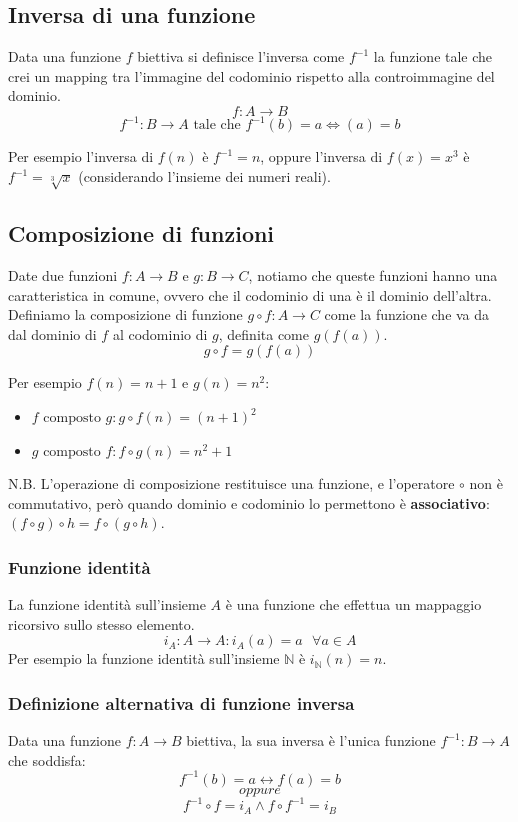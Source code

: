 \documentclass{article}
\begin{document}
\subsection{Inversa di una funzione}
Data una funzione $f$ biettiva si definisce l'inversa come $f^{-1}$ la funzione tale che crei un mapping tra l'immagine del codominio rispetto alla controimmagine del dominio.
$$f:A\rightarrow B$$
$$f^{-1}:B\rightarrow A \text{ tale che } f^{-1}(b)=a \Longleftrightarrow (a)=b$$

Per esempio l'inversa di $f(n)$ è $f^{-1}=n$, oppure l'inversa di $f(x)=x^3$ è $f^{-1}=\sqrt[3]{x}$ (considerando l'insieme dei numeri reali).

\subsection{Composizione di funzioni}
Date due funzioni $f:A\rightarrow B$ e $g:B\rightarrow C$, notiamo che queste funzioni hanno una caratteristica in comune, ovvero che il codominio di una è il dominio dell'altra.
Definiamo la composizione di funzione $g\circ f:A\rightarrow C$ come la funzione che va da dal dominio di $f$ al codominio di $g$, definita come $g(f(a))$.
$$g\circ f=g(f(a))$$

Per esempio $f(n)=n+1 \text{ e } g(n)=n^2$:
\begin{itemize}
    \item $f \text{ composto } g: g\circ f(n)=(n+1)^2$
    \item $g \text{ composto } f: f\circ g(n)=n^2+1$
\end{itemize}

N.B. L'operazione di composizione restituisce una funzione, e l'operatore $\circ$ non è commutativo, però quando dominio e codominio lo permettono è \textbf{associativo}: $(f\circ g)\circ h=f\circ (g \circ h)$.

\subsubsection{Funzione identità}
La funzione identità sull'insieme $A$ è una funzione che effettua un mappaggio ricorsivo sullo stesso elemento.
$$i_A:A\rightarrow A : i_A(a)=a\text{ }\forall a\in A$$
Per esempio la funzione identità sull'insieme $\mathbb{N}$ è $i_\mathbb{N}(n)=n$.

\subsubsection{Definizione alternativa di funzione inversa}
Data una funzione $f:A\rightarrow B$ biettiva, la sua inversa è l'unica funzione $f^{-1}:B\rightarrow A$ che soddisfa:
$$f^{-1}(b)=a \longleftrightarrow f(a)=b$$
$$oppure$$
$$f^{-1}\circ f=i_A \land f\circ f^{-1}=i_B$$
\end{document}
